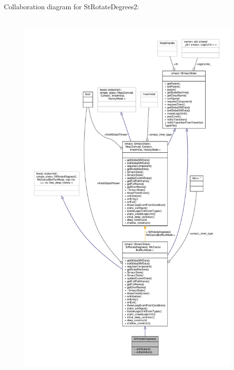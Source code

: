Collaboration diagram for St\+Rotate\+Degrees2\+:
\nopagebreak
\begin{figure}[H]
\begin{center}
\leavevmode
\includegraphics[height=550pt]{structStRotateDegrees2__coll__graph}
\end{center}
\end{figure}
